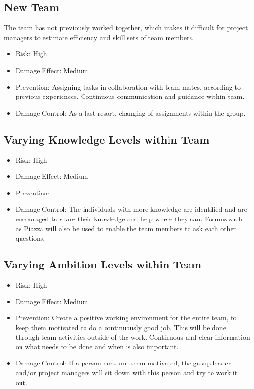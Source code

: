 \documentclass[a4paper]{article}
\begin{document}
\subsection{New Team}
The team has not previously worked together, which makes it difficult for project managers to estimate efficiency and skill sets of team members.
\begin{itemize}
\item Risk: High
\item Damage Effect: Medium
\item Prevention: Assigning tasks in collaboration with team mates, according to previous experiences. Continuous communication and guidance within team.
\item Damage Control: As a last resort, changing of assignments within the group.
\end{itemize}

\subsection{Varying Knowledge Levels within Team}
\begin{itemize}
\item Risk: High
\item Damage Effect: Medium
\item Prevention: -
\item Damage Control: The individuals with more knowledge are identified and are encouraged to share their knowledge and help where they can. Forums such as Piazza will also be used to enable the team members to ask each other questions. 
\end{itemize}

\subsection{Varying Ambition Levels within Team}
\begin{itemize}
\item Risk: High
\item Damage Effect: Medium
\item Prevention: Create a positive working environment for the entire team, to keep them motivated to do a continuously good job. This will be done through team activities outside of the work. Continuous and clear information on what needs to be done and when is also important.
\item Damage Control: If a person does not seem motivated, the group leader and/or project managers will sit down with this person and try to work it out.
\end{itemize}
\end{document}
